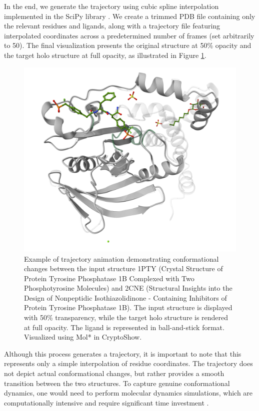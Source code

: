 In the end, we generate the trajectory using cubic spline interpolation \cite{mckinley1998cubic} implemented in the SciPy library \cite{virtanen2020scipy}. We create a trimmed PDB file containing only the relevant residues and ligands, along with a trajectory file featuring interpolated coordinates across a predetermined number of frames (set arbitrarily to 50). The final visualization presents the original structure at 50\% opacity and the target holo structure at full opacity, as illustrated in Figure \ref{fig:trajectory-animation}.

\begin{figure}[htbp]
    \centering
    \includegraphics[width=\textwidth]{img/trajectory_animation.png}
    \caption{Example of trajectory animation demonstrating conformational changes between the input structure 1PTY (Crystal Structure of Protein Tyrosine Phosphatase 1B Complexed with Two Phosphotyrosine Molecules) and 2CNE (Structural Insights into the Design of Nonpeptidic Isothiazolidinone - Containing Inhibitors of Protein Tyrosine Phosphatase 1B). The input structure is displayed with 50\% transparency, while the target holo structure is rendered at full opacity. The ligand is represented in ball-and-stick format. Visualized using Mol* in CryptoShow.}
    \label{fig:trajectory-animation}
\end{figure}

Although this process generates a trajectory, it is important to note that this represents only a simple interpolation of residue coordinates. The trajectory does not depict actual conformational changes, but rather provides a smooth transition between the two structures. To capture genuine conformational dynamics, one would need to perform molecular dynamics simulations, which are computationally intensive and require significant time investment \cite{schlitter1993targeted}.

